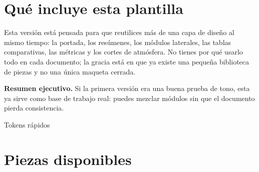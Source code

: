 \documentclass[11pt,a4paper]{article}
\newcommand{\UIFont}{\sffamily}
\begin{document}
\section{Qué incluye esta plantilla}


\begin{minipage}[t]{0.62\textwidth}
Esta versión está pensada para que reutilices más de una capa de diseño al mismo tiempo: la portada,
los resúmenes, los módulos laterales, las tablas comparativas, las métricas y los cortes de atmósfera.
No tienes por qué usarlo todo en cada documento; la gracia está en que ya existe una pequeña biblioteca
de piezas y no una única maqueta cerrada.

\begin{claudenote}
\UIFont\small
\textbf{\color{claudeInk}Resumen ejecutivo.}
Si la primera versión era una buena prueba de tono, esta ya sirve como base de trabajo real:
puedes mezclar módulos sin que el documento pierda consistencia.
\end{claudenote}
\end{minipage}\hfill
\begin{minipage}[t]{0.34\textwidth}
\begin{claudeaside}{Tokens rápidos}
\end{claudeaside}
\end{minipage}

\section{Piezas disponibles}
\end{document}
